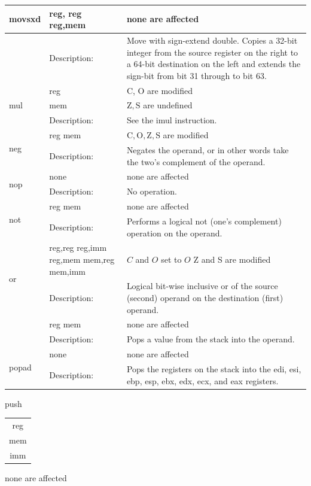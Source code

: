 \documentclass[10pt]{book}
\begin{document}
\begin{center}
\begin{tabular}{|l|l|l|}
\hline
movsxd & reg, reg reg,mem & none are affected \\
\hline
 & Description: & Move with sign-extend double. Copies a 32-bit integer from the source register on the right to a 64-bit destination on the left and extends the sign-bit from bit 31 through to bit 63. \\
\hline
\multirow[t]{3}{*}{mul} & reg & C, O are modified \\
\hline
 & mem & $\mathrm{Z}, \mathrm{S}$ are undefined \\
\hline
 & Description: & See the imul instruction. \\
\hline
\multirow[t]{2}{*}{neg} & reg mem & $\mathrm{C}, \mathrm{O}, \mathrm{Z}, \mathrm{S}$ are modified \\
\hline
 & Description: & Negates the operand, or in other words take the two's complement of the operand. \\
\hline
\multirow[t]{2}{*}{nop} & none & none are affected \\
\hline
 & Description: & No operation. \\
\hline
\multirow[t]{2}{*}{not} & reg mem & none are affected \\
\hline
 & Description: & Performs a logical not (one's complement) operation on the operand. \\
\hline
\multirow[t]{2}{*}{or} & reg,reg reg,imm reg,mem mem,reg mem,imm & $C$ and $O$ set to $O$ Z and S are modified \\
\hline
 & Description: & Logical bit-wise inclusive or of the source (second) operand on the destination (first) operand. \\\index{Inclusive or}
\hline
\multirow[t]{2}{*}{pop} & reg mem & none are affected \\
\hline
 & Description: & Pops a value from the stack into the operand. \\
\hline
\multirow[t]{2}{*}{popad} & none & none are affected \\
\hline
 & Description: & Pops the registers on the stack into the edi, esi, ebp, esp, ebx, edx, ecx, and eax registers. \\
\hline
\end{tabular}
\end{center}

push \begin{tabular}{c}
reg \\
mem \\
imm \\
\end{tabular} none are affected
\end{document}
